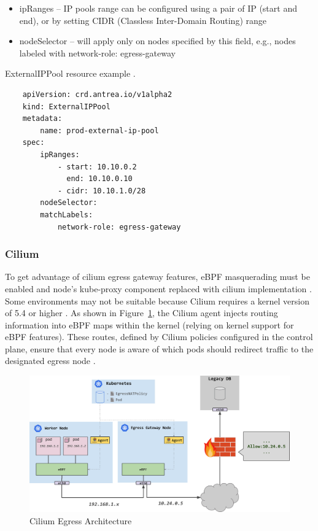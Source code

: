 \begin{itemize}
    \item ipRanges -- IP pools range can be configured using a pair of IP (start and end), or by setting CIDR (Classless Inter-Domain Routing) range
    \item nodeSelector -- will apply only on nodes specified by this field, e.g., nodes labeled with network-role: egress-gateway
\end{itemize}

\begin{listing}[htb]
    \centering
    \caption{ExternalIPPool resource example \cite{AntreaEgressArch}.}
    \begin{verbatim}
    apiVersion: crd.antrea.io/v1alpha2
    kind: ExternalIPPool
    metadata:
        name: prod-external-ip-pool
    spec:
        ipRanges:
            - start: 10.10.0.2
              end: 10.10.0.10
            - cidr: 10.10.1.0/28
        nodeSelector:
        matchLabels:
            network-role: egress-gateway
    \end{verbatim}
    \label{lst:yamlAntreaExternalIPPool}
\end{listing}
  


\subsubsection{Cilium}
\label{subsection:ciliumEgress}

To get advantage of cilium egress gateway features, eBPF masquerading must be enabled and node's kube-proxy component replaced with cilium implementation \cite{CiliumEgressGateway}. Some environments may not be suitable because Cilium requires a kernel version of 5.4 or higher \cite{CiliumInstall}. As shown in Figure~\ref{fig:ciliumEgressArch}, the Cilium agent injects routing information into eBPF maps within the kernel (relying on kernel support for eBPF features). These routes, defined by Cilium policies configured in the control plane, ensure that every node is aware of which pods should redirect traffic to the designated egress node \cite{CiliumEgressGateway}.

\begin{figure}[tbh]
    \centering
    \includegraphics[width=0.9\columnwidth]{images/cilium_egress.png}
    \caption{Cilium Egress Architecture \cite{CiliumEgressGatewayBlog}}
    \label{fig:ciliumEgressArch}
\end{figure}

